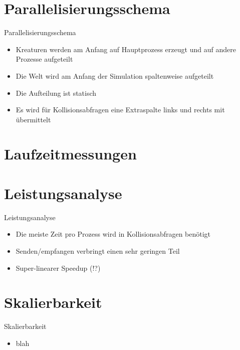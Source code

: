 \documentclass{beamer}
\begin{document}
\section{Parallelisierungsschema}
\begin{frame}{Parallelisierungsschema}
\begin{itemize}
	\item Kreaturen werden am Anfang auf Hauptprozess erzeugt und auf andere Prozesse aufgeteilt
    \item Die Welt wird am Anfang der Simulation spaltenweise aufgeteilt
    \item Die Aufteilung ist statisch
    \item Es wird für Kollisionsabfragen eine Extraspalte links und rechts mit übermittelt
\end{itemize}
\end{frame}


\section{Laufzeitmessungen}


\section{Leistungsanalyse}
\begin{frame}{Leistungsanalyse}
\begin{itemize}
    \item Die meiste Zeit pro Prozess wird in Kollisionsabfragen benötigt
    \item Senden/empfangen verbringt einen sehr geringen Teil
    \item Super-linearer Speedup (!?)
\end{itemize}
\end{frame}


\section{Skalierbarkeit}
\begin{frame}{Skalierbarkeit}
\begin{itemize}
    \item blah
\end{itemize}
\end{frame}
\end{document}
